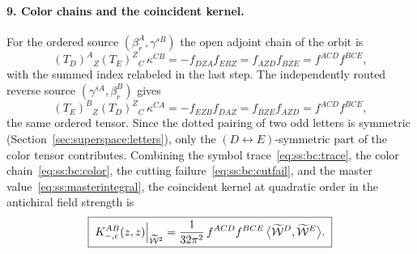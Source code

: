 \paragraph{9. Color chains and the coincident kernel.}
For the ordered source $(\beta_{r}^{A},\gamma^{sB})$ the open adjoint chain of
the orbit is
\begin{equation}\label{eq:ss:bc:color}
(T_{D})^{A}{}_{Z}(T_{E})^{Z}{}_{C}\,\kappa^{CB}
=-f_{DZA}f_{EBZ}
=f_{AZD}f_{BZE}
=f^{ACD}f^{BCE} ,
\end{equation}
with the summed index relabeled in the last step. The independently routed
reverse source $(\gamma^{sA},\beta_{r}^{B})$ gives
\begin{equation}\label{eq:ss:bc:colorrev}
(T_{E})^{B}{}_{Z}(T_{D})^{Z}{}_{C}\,\kappa^{CA}
=-f_{EZB}f_{DAZ}
=f_{BZE}f_{AZD}
=f^{ACD}f^{BCE} ,
\end{equation}
the same ordered tensor. Since the dotted pairing of two odd letters is
symmetric (Section~\ref{sec:superspace:letters}), only the
$(D\!\leftrightarrow\!E)$-symmetric part of the color tensor contributes.
Combining the symbol trace~\eqref{eq:ss:bc:trace}, the color
chain~\eqref{eq:ss:bc:color}, the cutting failure~\eqref{eq:ss:bc:cutfail},
and the master value~\eqref{eq:ss:masterintegral}, the coincident kernel at
quadratic order in the antichiral field strength is
\begin{equation}\label{eq:ss:bc:kernel}
\boxed{\;
K_{-,\epsilon}^{AB}(z,z)\Big|_{\widetilde{\mathcal{W}}^{2}}
=\frac{1}{32\pi^{2}}\,f^{ACD}f^{BCE}\,
\big\langle\widetilde{\mathcal{W}}^{D},\widetilde{\mathcal{W}}^{E}\big\rangle .\;}
\end{equation}

